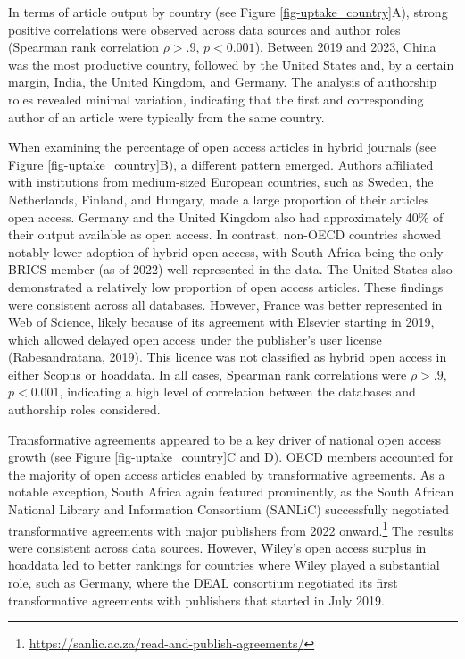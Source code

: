 \documentclass[a4paper,man,floatsintext,longtable,noextraspace,10pt]{apa6}
\begin{document}
In terms of article output by country (see Figure
\ref{fig-uptake_country}A), strong positive correlations were observed
across data sources and author roles (Spearman rank correlation
\(\rho > .9\), \(p < 0.001\)). Between 2019 and 2023, China was the most
productive country, followed by the United States and, by a certain
margin, India, the United Kingdom, and Germany. The analysis of
authorship roles revealed minimal variation, indicating that the first
and corresponding author of an article were typically from the same
country.

When examining the percentage of open access articles in hybrid journals
(see Figure \ref{fig-uptake_country}B), a different pattern emerged.
Authors affiliated with institutions from medium-sized European
countries, such as Sweden, the Netherlands, Finland, and Hungary, made a
large proportion of their articles open access. Germany and the United
Kingdom also had approximately 40\% of their output available as open
access. In contrast, non-OECD countries showed notably lower adoption of
hybrid open access, with South Africa being the only BRICS member (as of
2022) well-represented in the data. The United States also demonstrated
a relatively low proportion of open access articles. These findings were
consistent across all databases. However, France was better represented
in Web of Science, likely because of its agreement with Elsevier
starting in 2019, which allowed delayed open access under the
publisher's user license (Rabesandratana, 2019). This licence was not
classified as hybrid open access in either Scopus or hoaddata. In all
cases, Spearman rank correlations were \(\rho > .9\), \(p < 0.001\),
indicating a high level of correlation between the databases and
authorship roles considered.

Transformative agreements appeared to be a key driver of national open
access growth (see Figure \ref{fig-uptake_country}C and D). OECD members
accounted for the majority of open access articles enabled by
transformative agreements. As a notable exception, South Africa again
featured prominently, as the South African National Library and
Information Consortium (SANLiC) successfully negotiated transformative
agreements with major publishers from 2022 onward.\footnote{\url{https://sanlic.ac.za/read-and-publish-agreements/}}
The results were consistent across data sources. However, Wiley's open
access surplus in hoaddata led to better rankings for countries where
Wiley played a substantial role, such as Germany, where the DEAL
consortium negotiated its first transformative agreements with
publishers that started in July 2019.
\end{document}
